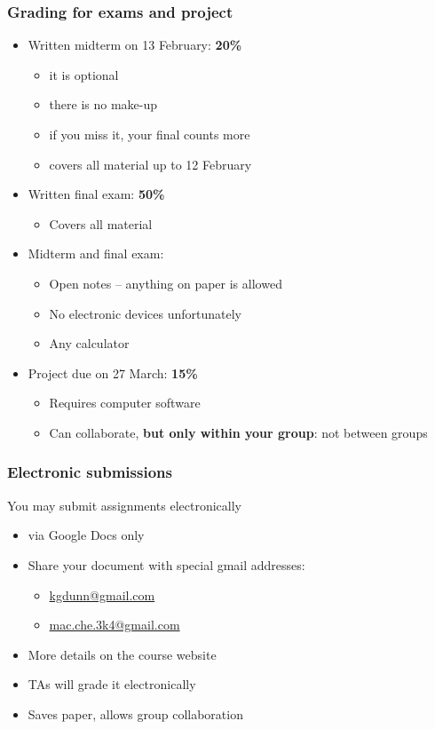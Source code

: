 \begin{frame}\frametitle{Grading for exams and project}
	\begin{itemize}
		\item	Written midterm on 13 February: \textbf{20\%} 
		\begin{itemize}
			\item	it is optional 
			\item	there is no make-up 
			\item	if you miss it, your final counts more
			\item	covers all material up to 12 February
		\end{itemize}
	\end{itemize}
	\begin{itemize}
		\item	Written final exam: \textbf{50\%} 
		\begin{itemize}
			\item	Covers all material 
		\end{itemize}
	\end{itemize}
	\begin{itemize}
		\item	Midterm and final exam: 
		\begin{itemize}
			\item	Open notes -- anything on paper is allowed 
			\item	No electronic devices unfortunately 
			\item	Any calculator 
		\end{itemize}
	\end{itemize}
	\begin{itemize}
		\item	Project due on 27 March: \textbf{15\%} 
		\begin{itemize}
			\item	Requires computer software 
			\item	Can collaborate, \textbf{but only within your group}: not between groups 
		\end{itemize}
	\end{itemize}
\end{frame}

\begin{frame}\frametitle{Electronic submissions}
	You may submit assignments electronically
	\begin{itemize}
		\item	via Google Docs only
		\item	Share your document with special gmail addresses:
		\begin{itemize}
			\item	\url{kgdunn@gmail.com}
			\item	\url{mac.che.3k4@gmail.com}
		\end{itemize}
		\item	More details on the course website
		\item	TAs will grade it electronically
		\item	Saves paper, allows group collaboration
	\end{itemize}
\end{frame}

